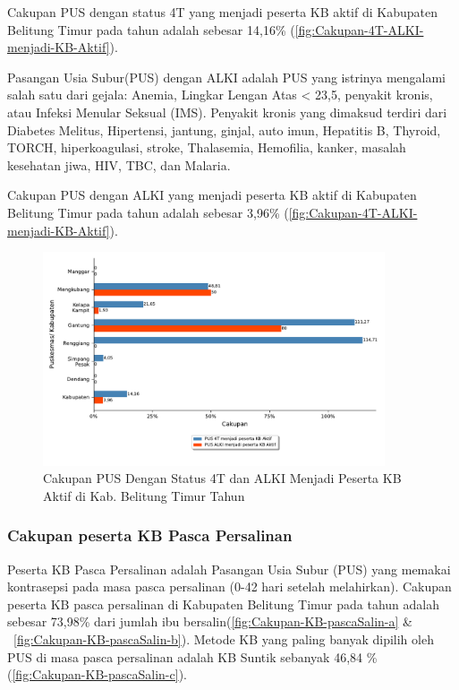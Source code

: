 Cakupan PUS dengan status 4T yang menjadi peserta KB aktif di Kabupaten Belitung Timur pada tahun \tP  adalah sebesar 14,16\% (\autoref{fig:Cakupan-4T-ALKI-menjadi-KB-Aktif}).

Pasangan Usia Subur(PUS) dengan ALKI adalah PUS yang istrinya mengalami salah satu dari gejala: Anemia, Lingkar Lengan Atas < 23,5, penyakit kronis, atau Infeksi Menular Seksual (IMS).
Penyakit kronis yang dimaksud terdiri dari Diabetes Melitus, Hipertensi, jantung, ginjal, auto imun, Hepatitis B, Thyroid, TORCH, hiperkoagulasi, stroke, Thalasemia, Hemofilia, kanker, masalah kesehatan jiwa, HIV, TBC, dan Malaria.

Cakupan PUS dengan ALKI yang menjadi peserta KB aktif di Kabupaten Belitung Timur pada tahun \tP  adalah sebesar 3,96\% (\autoref{fig:Cakupan-4T-ALKI-menjadi-KB-Aktif}).

\begin{figure}[H]
	\centering
	\includegraphics[width=0.9\textwidth]{bab_05/bab_05_06a_KB4TALKI}
	\caption{Cakupan PUS Dengan Status 4T dan ALKI Menjadi Peserta KB Aktif di Kab. Belitung Timur Tahun \tP}
	\label{fig:Cakupan-4T-ALKI-menjadi-KB-Aktif}
\end{figure}

\subsubsection{Cakupan peserta KB Pasca Persalinan}
Peserta KB Pasca Persalinan adalah Pasangan Usia Subur (PUS) yang memakai kontrasepsi pada masa pasca persalinan (0-42 hari setelah melahirkan). Cakupan peserta KB pasca persalinan di Kabupaten Belitung Timur pada tahun \tP adalah sebesar 73,98\% dari jumlah ibu bersalin(\autoref{fig:Cakupan-KB-pascaSalin-a} \& ~\autoref{fig:Cakupan-KB-pascaSalin-b}). Metode KB yang paling banyak dipilih oleh PUS di masa pasca persalinan adalah KB Suntik sebanyak 46,84 \% (\autoref{fig:Cakupan-KB-pascaSalin-c}).

